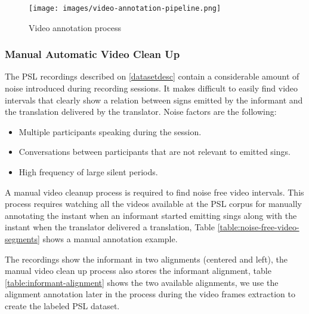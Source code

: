 \documentclass[twocolumn,conference]{article}
\begin{document}
\begin{figure}[hbt!]
\texttt{[image: images/video-annotation-pipeline.png]}
\caption{Video annotation process}
\label{fig:video-annotation-pipeline}
\end{figure}

\subsubsection{Manual Automatic Video Clean Up}\label{manual-video-cleanup}
The PSL recordings described on \ref{datasetdesc} contain a considerable amount of noise introduced during recording sessions. It makes difficult to easily find video intervals that clearly show a relation between signs emitted by the informant and the translation delivered by the translator. Noise factors are the following:
\begin{itemize}
	\item Multiple participants speaking during the session.
	\item Conversations between participants that are not relevant to emitted sings.
	\item High frequency of large silent periods.
\end{itemize}
A manual video cleanup process is required to find noise free video intervals. This process requires watching all the videos available at the PSL corpus for manually annotating the instant when an informant started emitting sings along with the instant when the translator delivered a translation, Table \ref{table:noise-free-video-segments} shows a manual annotation example.

The recordings show the informant in two alignments (centered and left), the manual video clean up process also stores the informant alignment, table \ref{table:informant-alignment} shows the two available alignments, we use the alignment annotation later in the process during the video frames extraction to create the labeled PSL dataset.
\end{document}
